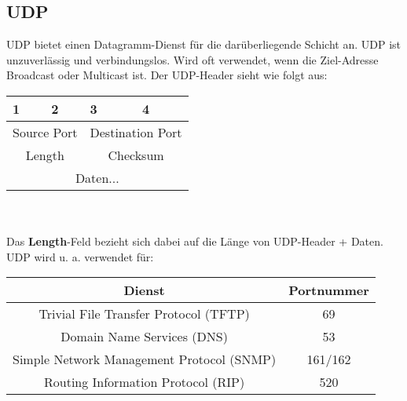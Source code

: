 \documentclass[a4paper,10pt]{scrartcl}
\begin{document}
    \subsection{UDP}
        UDP bietet einen Datagramm-Dienst für die darüberliegende Schicht an. UDP ist unzuverlässig und verbindungslos. Wird oft verwendet, wenn die Ziel-Adresse Broadcast oder Multicast ist. Der UDP-Header sieht wie folgt aus:\\
        \begin{tabular}{|p{3cm}|p{3cm}|p{3cm}|p{3cm}|}
            \toprule 
            1 & 2 & 3 & 4  \\
            \midrule\midrule
            \multicolumn{2}{|c|}{Source Port} & \multicolumn{2}{|c|}{Destination Port}\\
            \midrule
            \multicolumn{2}{|c|}{Length} & \multicolumn{2}{|c|}{Checksum}\\
            \midrule
            \multicolumn{4}{|c|}{Daten...}\\
            \bottomrule
        \end{tabular}\\ \\
        Das \textbf{Length}-Feld bezieht sich dabei auf die Länge von UDP-Header + Daten. \\
        UDP wird u. a. verwendet für:\\ 
        \begin{tabular}{|c|c|}
            \hline
            Dienst & Portnummer \\
            \hline
            Trivial File Transfer Protocol (TFTP) & 69 \\
            Domain Name Services (DNS) & 53 \\
            Simple Network Management Protocol (SNMP) & 161/162\\
            Routing Information Protocol (RIP) & 520\\
            \hline
        \end{tabular}  \\ 
\end{document}
